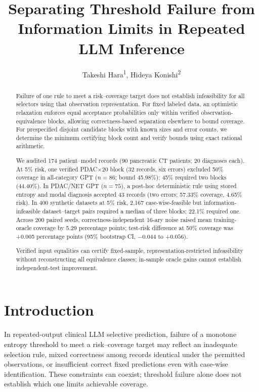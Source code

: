 \documentclass[letterpaper]{article}
\title{Separating Threshold Failure from Information Limits in Repeated LLM Inference}
\author{Takeshi Hara\textsuperscript{\rm 1}, Hideya Konishi\textsuperscript{\rm 2}}
\begin{document}
\maketitle



\begin{abstract}
Failure of one rule to meet a risk--coverage target does not establish infeasibility for all selectors using that observation representation. For fixed labeled data, an optimistic relaxation enforces equal acceptance probabilities only within verified observation-equivalence blocks, allowing correctness-based separation elsewhere to bound coverage. For prespecified disjoint candidate blocks with known sizes and error counts, we determine the minimum certifying block count and verify bounds using exact rational arithmetic.

We audited 174 patient--model records (90 pancreatic CT patients; 20 diagnoses each). At 5\% risk, one verified PDAC$\times$20 block (32 records, six errors) excluded 50\% coverage in all-category GPT ($n=86$; bound 45.98\%); 45\% required two blocks (44.40\%). In PDAC/NET GPT ($n=75$), a post-hoc deterministic rule using stored entropy and modal diagnosis accepted 43 records (two errors; 57.33\% coverage, 4.65\% risk). In 400 synthetic datasets at 5\% risk, 2,167 case-wise-feasible but information-infeasible dataset--target pairs required a median of three blocks; 22.1\% required one. Across 200 paired seeds, correctness-independent 16-ary noise raised mean training-oracle coverage by 5.29 percentage points; test-risk difference at 50\% coverage was +0.005 percentage points (95\% bootstrap CI, $-0.044$ to $+0.056$).

Verified input equalities can certify fixed-sample, representation-restricted infeasibility without reconstructing all equivalence classes; in-sample oracle gains cannot establish independent-test improvement.
\end{abstract}

\section{Introduction}

In repeated-output clinical LLM selective prediction, failure of a monotone entropy threshold to meet a risk--coverage target may reflect an inadequate selection rule, mixed correctness among records identical under the permitted observations, or insufficient correct fixed predictions even with case-wise identification. These constraints can coexist; threshold failure alone does not establish which one limits achievable coverage.
\end{document}
